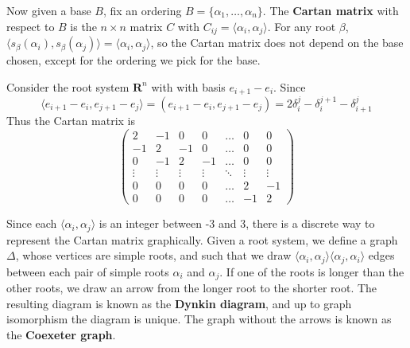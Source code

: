 Now given a base $B$, fix an ordering $B = \{ \alpha_1, \dots, \alpha_n \}$. The {\bf Cartan matrix} with respect to $B$ is the $n \times n$ matrix $C$ with $C_{ij} = \langle \alpha_i, \alpha_j \rangle$. For any root $\beta$, $\langle s_\beta(\alpha_i), s_\beta(\alpha_j) \rangle = \langle \alpha_i, \alpha_j \rangle$, so the Cartan matrix does not depend on the base chosen, except for the ordering we pick for the base.

\begin{example}
    Consider the root system $\mathbf{R}^n$ with with basis $e_{i+1} - e_i$. Since
    \[ \langle e_{i+1} - e_i, e_{j+1} - e_j \rangle = (e_{i+1} - e_i, e_{j+1} - e_j) = 2 \delta_i^j - \delta_i^{j+1} - \delta_{i+1}^j \]
    Thus the Cartan matrix is
    \[ \begin{pmatrix} 2 & -1 & 0 & 0 & \dots & 0 & 0\\
                      -1 & 2 & -1 & 0 & \dots & 0 & 0\\
                       0 & -1 & 2 & -1 & \dots & 0 & 0 \\
                       \vdots & \vdots & \vdots & \vdots & \ddots & \vdots & \vdots\\
                       0 & 0 & 0 & 0 & \dots & 2 & -1\\
                       0 & 0 & 0 & 0 & \dots & -1 & 2\end{pmatrix} \]
\end{example}

Since each $\langle \alpha_i, \alpha_j \rangle$ is an integer between -3 and 3, there is a discrete way to represent the Cartan matrix graphically. Given a root system, we define a graph $\Delta$, whose vertices are simple roots, and such that we draw $\langle \alpha_i, \alpha_j \rangle \langle \alpha_j, \alpha_i \rangle$ edges between each pair of simple roots $\alpha_i$ and $\alpha_j$. If one of the roots is longer than the other roots, we draw an arrow from the longer root to the shorter root. The resulting diagram is known as the {\bf Dynkin diagram}, and up to graph isomorphism  the diagram is unique. The graph without the arrows is known as the {\bf Coexeter graph}.

